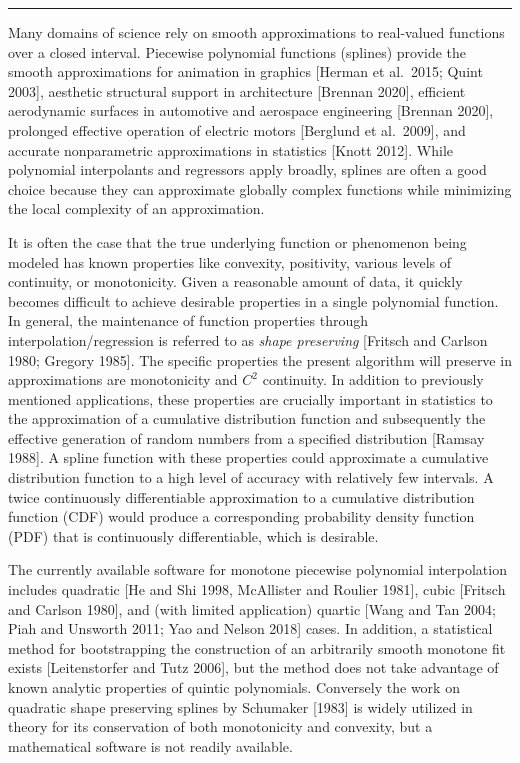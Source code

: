 \bigskip\hrule\bigskip\medskip
{}

Many domains of science rely on smooth approximations to real-valued
functions over a closed interval. Piecewise polynomial functions
(splines) provide the smooth approximations for animation in graphics
[Herman et al.\ 2015; Quint 2003], aesthetic structural support in
architecture [Brennan 2020], efficient aerodynamic surfaces in
automotive and aerospace engineering [Brennan 2020], prolonged
effective operation of electric motors [Berglund et al.\ 2009], and
accurate nonparametric approximations in statistics [Knott
2012]. While polynomial interpolants and regressors apply broadly,
splines are often a good choice because they can approximate globally
complex functions while minimizing the local complexity of an
approximation.

It is often the case that the true underlying function or phenomenon
being modeled has known properties like convexity, positivity,
various levels of continuity, or monotonicity. Given a reasonable
amount of data, it quickly becomes difficult to achieve desirable
properties in a single polynomial function. In general, the
maintenance of function properties through interpolation/regression is
referred to as {\it shape preserving} [Fritsch and Carlson 1980;
Gregory 1985]. The specific properties the present algorithm will
preserve in approximations are monotonicity and $C^2$ continuity. In
addition to previously mentioned applications, these properties are
crucially important in statistics to the approximation of a cumulative
distribution function and subsequently the effective generation of
random numbers from a specified distribution [Ramsay 1988].  A spline
function with these properties could approximate a cumulative
distribution function to a high level of accuracy with relatively few
intervals. A twice continuously differentiable approximation to a
cumulative distribution function (CDF) would produce a corresponding
probability density function (PDF) that is continuously
differentiable, which is desirable.

The currently available software for monotone piecewise polynomial
interpolation includes quadratic [He and Shi 1998, McAllister and 
Roulier 1981], cubic [Fritsch and Carlson 1980], and (with limited
application) quartic [Wang and Tan 2004; Piah and Unsworth 2011; Yao
and Nelson 2018] cases. In addition, a statistical method for
bootstrapping the construction of an arbitrarily smooth monotone fit
exists [Leitenstorfer and Tutz 2006], but the method does not take
advantage of known analytic properties of quintic polynomials. 
Conversely the work on quadratic shape preserving splines by Schumaker
[1983] is widely utilized in theory for its conservation of both
monotonicity and convexity, but a mathematical software is not readily
available.

